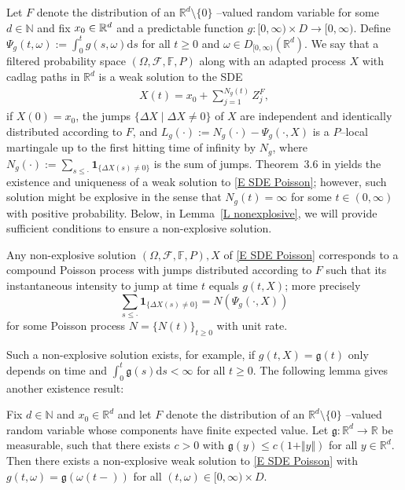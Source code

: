 Let $F$ denote the distribution of an ${\mathbb{R}}^{d}\setminus \{0\}$%
--valued random variable for some $d\in \mathbb{N}$ and fix $x_{0}\in {%
\mathbb{R}}^{d}$ and a predictable function $g:[0,\infty )\times
D\rightarrow {\mathbb{[}}0,\infty )$. Define $\Psi_g(t,\omega
):=\int_{0}^{t}g(s,\omega )\mathrm{d}s$ for all $t\geq 0$ and $\omega \in
D_{[0,\infty )}({\mathbb{R}}^{d})$. We say that a filtered probability space
$(\Omega ,\mathcal{F},\mathbb{F},P)$ along with an adapted process $X$ with
cadlag paths in ${\mathbb{R}}^{d}$ is a weak solution to the SDE
\begin{align}  \label{E SDE Poisson}
X(t)=x_{0}+\sum_{j=1}^{N_g( t) }Z_{j}^{F},
\end{align}%
if $X(0)=x_{0}$, the jumps $\{\Delta X\mid \Delta X\neq 0\}$ of $X$ are
independent and identically distributed according to $F$, and $L_g\left(
\cdot \right) :=N_g\left( \cdot \right) -\Psi _g(\cdot ,X)$ is a $P$--local
martingale up to the first hitting time of infinity by $N_g$, where $%
N_g\left( \cdot \right) :=\sum_{s\leq \cdot }\mathbf{1}_{\{\Delta X(s)\neq
0\}}$ is the sum of jumps.  Theorem~3.6 in \citet{Jacod_1975} yields the existence and uniqueness of a weak solution to \eqref{E SDE Poisson};
however, such solution might be explosive in the sense that $N_g\left(
t\right) =\infty $ for some $t\in \left( 0,\infty \right) $ with positive
probability. Below, in Lemma~\ref{L nonexplosive}, we will provide
sufficient conditions to ensure a non-explosive solution.

Any non-explosive solution $(\Omega ,\mathcal{F},\mathbb{F},P),X$ of %
\eqref{E SDE Poisson} corresponds to a compound Poisson process with jumps
distributed according to $F$ such that its instantaneous intensity to jump
at time $t$ equals $g(t,X)$; more precisely
\begin{equation*}
\sum_{s\leq \cdot }\mathbf{1}_{\{\Delta X(s)\neq 0\}}=N\left( \Psi _g(\cdot
,X)\right)
\end{equation*}%
for some Poisson process $N=\{N\left( t\right) \}_{t\geq 0}$ with unit rate.

Such a non-explosive solution exists, for example, if $g(t,X)=\mathfrak{g}(t)
$ only depends on time and $\int_{0}^{t}\mathfrak{g}(s)\mathrm{d}s<\infty $
for all $t\geq 0$. The following lemma gives another existence result:

\begin{lemma}
\label{L nonexplosive} Fix $d\in \mathbb{N}$ and $x_{0}\in {\mathbb{R}}^{d}$
and let $F$ denote the distribution of an ${\mathbb{R}}^{d}\setminus \{0\}$%
--valued random variable whose components have finite expected value. Let $%
\mathfrak{g}:{\mathbb{R}}^{d}\rightarrow {\mathbb{R}}$ be measurable, such
that there exists $c>0$ with $\mathfrak{g}(y)\leq c(1+\Vert y\Vert )$ for
all $y\in {\mathbb{R}}^{d}$. Then there exists a non-explosive weak solution
to \eqref{E SDE
Poisson} with $g(t,\omega )=\mathfrak{g}(\omega (t-))$ for all $(t,\omega
)\in \lbrack 0,\infty )\times D$.
\end{lemma}

